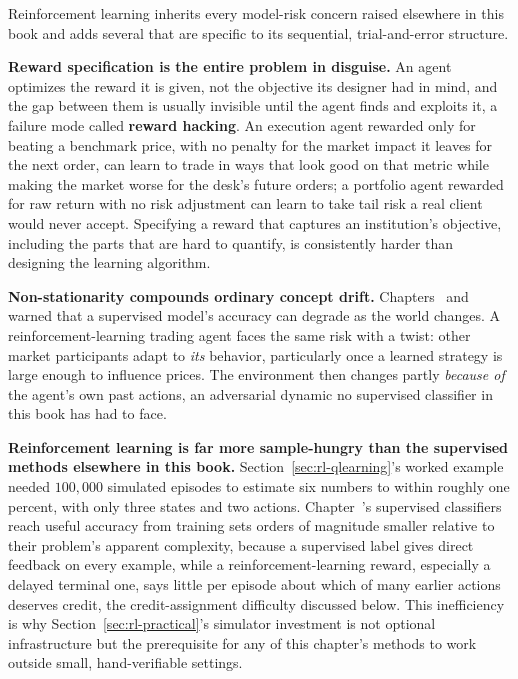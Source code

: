 \documentclass[../ai_in_finance]{subfiles}
\begin{document}
Reinforcement learning inherits every model-risk concern raised elsewhere in this book and adds several that are specific to its sequential, trial-and-error structure.

\textbf{Reward specification is the entire problem in disguise.} An agent optimizes the reward it is given, not the objective its designer had in mind, and the gap between them is usually invisible until the agent finds and exploits it, a failure mode called \textbf{reward hacking}. An execution agent rewarded only for beating a benchmark price, with no penalty for the market impact it leaves for the next order, can learn to trade in ways that look good on that metric while making the market worse for the desk's future orders; a portfolio agent rewarded for raw return with no risk adjustment can learn to take tail risk a real client would never accept. Specifying a reward that captures an institution's objective, including the parts that are hard to quantify, is consistently harder than designing the learning algorithm.

\textbf{Non-stationarity compounds ordinary concept drift.} Chapters~ and~ warned that a supervised model's accuracy can degrade as the world changes. A reinforcement-learning trading agent faces the same risk with a twist: other market participants adapt to \emph{its} behavior, particularly once a learned strategy is large enough to influence prices. The environment then changes partly \emph{because of} the agent's own past actions, an adversarial dynamic no supervised classifier in this book has had to face.

\textbf{Reinforcement learning is far more sample-hungry than the supervised methods elsewhere in this book.} Section~\ref{sec:rl-qlearning}'s worked example needed $100{,}000$ simulated episodes to estimate six numbers to within roughly one percent, with only three states and two actions. Chapter~'s supervised classifiers reach useful accuracy from training sets orders of magnitude smaller relative to their problem's apparent complexity, because a supervised label gives direct feedback on every example, while a reinforcement-learning reward, especially a delayed terminal one, says little per episode about which of many earlier actions deserves credit, the credit-assignment difficulty discussed below. This inefficiency is why Section~\ref{sec:rl-practical}'s simulator investment is not optional infrastructure but the prerequisite for any of this chapter's methods to work outside small, hand-verifiable settings.
\end{document}
